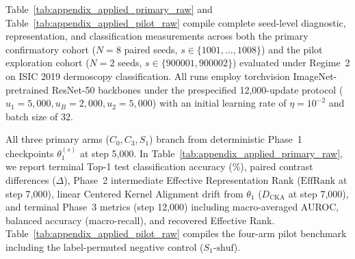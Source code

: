 \documentclass[sn-mathphys,Numbered]{sn-jnl}
\begin{document}
\begin{appendices}
Table~\ref{tab:appendix_applied_primary_raw} and Table~\ref{tab:appendix_applied_pilot_raw} compile complete seed-level diagnostic, representation, and classification measurements across both the primary confirmatory cohort ($N = 8$ paired seeds, $s \in \{1001, \dots, 1008\}$) and the pilot exploration cohort ($N = 2$ seeds, $s \in \{900001, 900002\}$) evaluated under Regime~2 on ISIC 2019 dermoscopy classification. All runs employ torchvision ImageNet-pretrained ResNet-50 backbones under the prespecified 12,000-update protocol ($u_1 = 5{,}000, u_B = 2{,}000, u_2 = 5{,}000$) with an initial learning rate of $\eta = 10^{-2}$ and batch size of $32$.

All three primary arms ($C_0, C_3, S_1$) branch from deterministic Phase~1 checkpoints $\theta_1^{(s)}$ at step 5,000. In Table~\ref{tab:appendix_applied_primary_raw}, we report terminal Top-1 test classification accuracy (\%), paired contrast differences ($\Delta$), Phase~2 intermediate Effective Representation Rank ($\mathrm{EffRank}$ at step 7,000), linear Centered Kernel Alignment drift from $\theta_1$ ($D_{\mathrm{CKA}}$ at step 7,000), and terminal Phase~3 metrics (step 12,000) including macro-averaged AUROC, balanced accuracy (macro-recall), and recovered Effective Rank. Table~\ref{tab:appendix_applied_pilot_raw} compiles the four-arm pilot benchmark including the label-permuted negative control ($S_1\text{-shuf}$).


\end{appendices}
\end{document}

